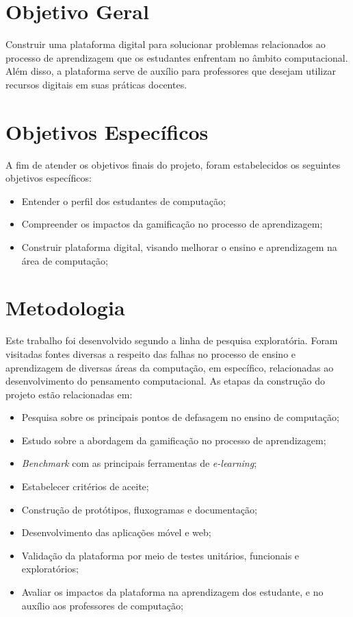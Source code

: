 \section{Objetivo Geral}
Construir uma plataforma digital para solucionar problemas relacionados ao processo de aprendizagem que os estudantes enfrentam no âmbito computacional. Além disso, a plataforma serve de auxílio para professores que desejam utilizar recursos digitais em suas práticas docentes.

\section{Objetivos Específicos}
A fim de atender os objetivos finais do projeto, foram estabelecidos os seguintes objetivos específicos:

\begin{itemize}
  \item Entender o perfil dos estudantes de computação;
  \item Compreender os impactos da gamificação no processo de aprendizagem;
  \item Construir plataforma digital, visando melhorar o ensino e aprendizagem na área de computação;
\end{itemize}

\section{Metodologia}
Este trabalho foi desenvolvido segundo a linha de pesquisa exploratória. Foram visitadas fontes diversas a respeito das falhas no processo de ensino e aprendizagem de diversas áreas da computação, em específico, relacionadas ao desenvolvimento do pensamento computacional. As etapas da construção do projeto estão relacionadas em:

\begin{itemize}
  \item Pesquisa sobre os principais pontos de defasagem no ensino de computação;
  \item Estudo sobre a abordagem da gamificação no processo de aprendizagem;
  \item \textit{Benchmark} com as principais ferramentas de \textit{e-learning};
  \item Estabelecer critérios de aceite;
  \item Construção de protótipos, fluxogramas e documentação;
  \item Desenvolvimento das aplicações móvel e web;
  \item Validação da plataforma por meio de testes unitários, funcionais e exploratórios;
  \item Avaliar os impactos da plataforma na aprendizagem dos estudante, e no auxílio aos professores de computação;
\end{itemize}

